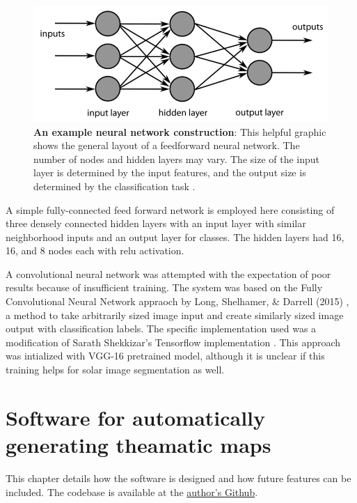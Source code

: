 \documentclass[twoside]{report}
\begin{document}
\begin{figure}[ht]
  \begin{center}
    \includegraphics[scale=0.5]{ffneural}
    \caption{{\bf An example neural network construction}: This helpful graphic shows the general layout of a feedforward neural network. The number of nodes and hidden layers may vary. The size of the input layer is determined by the input features, and the output size is determined by the classification task \cite{neuralexample}.}
 \end{center}
\end{figure}

A simple fully-connected feed forward network is employed here consisting of three densely connected hidden layers with an input layer with similar neighborhood inputs and an output layer for classes. The hidden layers had 16, 16, and 8 nodes each with relu activation. 

A convolutional neural network was attempted with the expectation of poor results because of insufficient training. The system was based on the Fully Convolutional Neural Network appraoch by Long, Shelhamer, \& Darrell (2015) \cite{fcnn}, a method to take arbitrarily sized image input and create similarly sized image output with classification labels. The specific implementation used was a modification of Sarath Shekkizar's Tensorflow implementation \cite{fcnntensorflow}. This approach was intialized with VGG-16 pretrained model, although it is unclear if this training helps for solar image segmentation as well.

\chapter{Software for automatically generating theamatic maps} 

This chapter details how the software is designed and how future features can be included. The codebase is available at the \href{https://github.com/jmbhughes/smachy}{author's Github}. 
\end{document}
